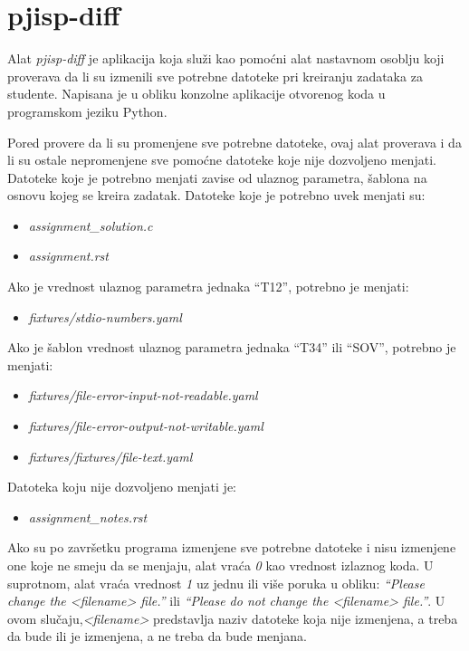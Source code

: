 \documentclass[12pt]{report}
\begin{document}
\section{pjisp-diff}

Alat \textit{pjisp-diff} \cite{pjisp-diff} je aplikacija koja služi kao pomoćni alat nastavnom osoblju koji proverava da li su izmenili sve potrebne datoteke pri kreiranju zadataka za studente. Napisana je u obliku konzolne aplikacije otvorenog koda u programskom jeziku Python.

Pored provere da li su promenjene sve potrebne datoteke, ovaj alat proverava i da li su ostale nepromenjene sve pomoćne datoteke koje nije dozvoljeno menjati. Datoteke koje je potrebno menjati zavise od ulaznog parametra, šablona na osnovu kojeg se kreira zadatak. Datoteke koje je potrebno uvek menjati su:

\begin{itemize}
    \item \textit{assignment\_solution.c}
    \item \textit{assignment.rst}
\end{itemize}

Ako je vrednost ulaznog parametra jednaka ``T12'', potrebno je menjati:

\begin{itemize}
    \item \textit{fixtures/stdio-numbers.yaml}
\end{itemize}

Ako je šablon vrednost ulaznog parametra jednaka ``T34'' ili ``SOV'', potrebno je menjati:

\begin{itemize}
    \item \textit{fixtures/file-error-input-not-readable.yaml}
    \item \textit{fixtures/file-error-output-not-writable.yaml}
    \item \textit{fixtures/fixtures/file-text.yaml}
\end{itemize}

Datoteka koju nije dozvoljeno menjati je:

\begin{itemize}
    \item \textit{assignment\_notes.rst}
\end{itemize}

Ako su po završetku programa izmenjene sve potrebne datoteke i nisu izmenjene one koje ne smeju da se menjaju, alat vraća \textit{0} kao vrednost izlaznog koda. U suprotnom, alat vraća vrednost \textit{1} uz jednu ili više poruka u obliku: \textit{``Please change the <filename> file.''} ili \textit{``Please do not change the <filename> file.''}. U ovom slučaju,\textit{<filename>} predstavlja naziv datoteke koja nije izmenjena, a treba da bude ili je izmenjena, a ne treba da bude menjana.
\end{document}
